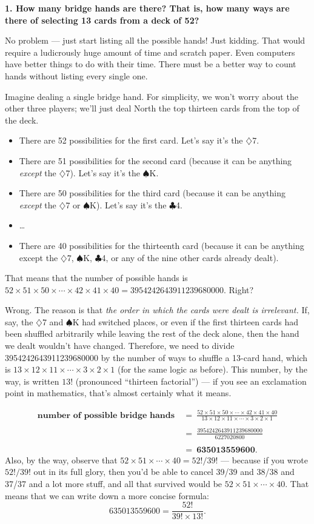 \documentclass{amsart}
\numberwithin{equation}{section}
\newcommand{\x}{\times}
\newcommand{\C}{$\clubsuit$}
\newcommand{\D}{$\diamondsuit$}
\renewcommand{\H}{$\heartsuit$}
\renewcommand{\S}{$\spadesuit$}
\begin{document}
\thispagestyle{empty}

\textbf{1. How many bridge hands are there?  That is, how many ways are there
of selecting 13 cards from a deck of 52?}

No problem --- just start listing all the possible hands!  Just kidding.
That would require a ludicrously huge amount of
time and scratch paper.  Even computers have better things to do with their time.
There must be a better way to count hands without listing every single one.

Imagine dealing a single bridge hand.  For simplicity, we won't worry about the other 
three players; we'll just deal North the top thirteen cards from the top of 
the deck.

\begin{itemize}
\item There are 52 possibilities for the first card.  Let's say it's the \D7.
\item There are 51 possibilities for the second card (because it can be anything \emph{except} the \D7).
Let's say it's the \S K.
\item There are 50 possibilities for the third card (because it can be anything \emph{except} the \D7 or \S K).
Let's say it's the \C4.
\item \dots
\item There are 40 possibilities for the thirteenth card (because it can be anything except the \D7, \S K, \C4, or any of the
nine other cards already dealt).%
\end{itemize}

That means that the number of possible hands is $52\x51\x50\x\cdots\x42\x41\x40 = 3954242643911239680000$.
Right?

Wrong.   The reason is that \emph{the order in which the cards were dealt is irrelevant.}  If, say, the \D7 and \S K had switched places,
or even if the first thirteen cards had been shuffled arbitrarily while leaving the rest of the deck alone, then the hand we dealt
wouldn't have changed.  Therefore, we need to divide 3954242643911239680000 by the number of ways to shuffle a 13-card hand,
which is $13\x12\x11\x\cdots\x3\x2\x1$ (for the same logic as before).  This number, by the way, is written $13!$ (pronounced
``thirteen factorial'') --- if you see an exclamation point in mathematics, that's almost certainly what it means.

\boldmath
\begin{align*}
\textbf{number of possible bridge hands} ~&=~ \frac{52\x51\x50\x\cdots\x42\x41\x40}{13\x12\x11\x\cdots\x3\x2\x1}\\\\
&=~ \frac{3954242643911239680000}{6227020800}\\\\
&=~ \mathbf{635013559600}.
\end{align*}
\unboldmath
Also, by the way, observe that $52\x51\x\cdots\x40=52!/39!$ --- because if you wrote $52!/39!$ out in its full glory, then
you'd be able to cancel 39/39 and 38/38 and 37/37 and a lot more stuff, and all that survived would be $52\x51\x\cdots\x40$.
That means that we can write down a more concise formula:
$$635013559600 =  \frac{52!}{39! \x 13!}.$$
\end{document}
